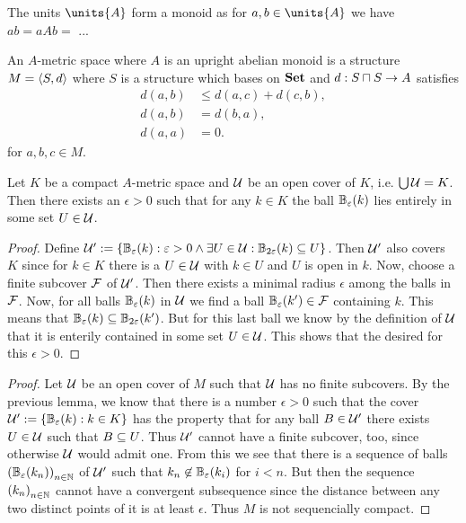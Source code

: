 \documentclass[8pt,a4paper]{article}
\begin{document}
\begin{remark}
    The units $\units{A}$ form a monoid as for $a,b\in\units{A}$ we have $ab=aAb=$ ...
\end{remark}

\begin{definition}
    An $A$-metric space where $A$ is an upright abelian monoid is a structure $M=\struct{S,d}$ where $S$ is a structure which bases on $\mathbf{Set}$ and $d:S\settimes S\to A$ satisfies
    \begin{align}
        d(a,b) &\leq d(a,c)+d(c,b),\\
        d(a,b) &=d(b,a),\\
        d(a,a) &=0.
    \end{align}
    for $a,b,c\in M$.
\end{definition}

\begin{lemma}[Lebesgue]
    Let $K$ be a compact $A$-metric space and $\mathcal{U}$ be an open cover of $K$, i.e. $\bigcup\mathcal{U}=K$. Then there exists an $\epsilon>0$ such that for any $k\in K$ the ball $\mathbb{B}_{\varepsilon}(k)$ lies entirely in some set $U\in \mathcal{U}$.
\end{lemma}

\begin{proof}
    Define $\cU':=\set{\ball_{\epsilon}(k):\epsilon>0\lgand\exists U\in\cU:\ball_{2\epsilon}(k)\setleq U}$. Then $\mathcal{U}'$ also covers $K$ since for $k\in K$ there is a $U\in\mathcal{U}$ with $k\in U$ and $U$ is open in $k$. Now, choose a finite subcover $\mathcal{F}$ of $\mathcal{U}'$. Then there exists a minimal radius $\epsilon$ among the balls in $\mathcal{F}$. Now, for all balls $\mathbb{B}_{\varepsilon}(k)$ in $\mathcal{U}$ we find a ball $\mathbb{B}_{\varepsilon}(k')\in\mathcal{F}$ containing $k$. This means that $\mathbb{B}_{\varepsilon}(k)\subseteq\mathbb{B}_{2\varepsilon}(k')$. But for this last ball we know by the definition of $\mathcal{U}$ that it is enterily contained in some set $U\in\mathcal{U}$.
    This shows that the desired for this $\epsilon>0$.
\end{proof}

\begin{lemma}

\end{lemma}

\begin{proof}
    Let $\mathcal{U}$ be an open cover of $M$ such that $\mathcal{U}$ has no finite subcovers. By the previous lemma, we know that there is a number $\epsilon>0$ such that the cover $\cU':=\set{\ball_{\epsilon}(k):k\in K}$ has the property that for any ball $B\in \mathcal{U}'$ there exists $U\in\mathcal{U}$ such that $B\subseteq U$. Thus $\mathcal{U}'$ cannot have a finite subcover, too, since otherwise $\mathcal{U}$ would admit one. From this we see that there is a sequence of balls $\net[n\in\nats]{\ball_{\epsilon}(k_n)}$ of $\mathcal{U}'$ such that $k_n\not\in \mathbb{B}_{\varepsilon}(k_i)$ for $i< n$. But then the sequence $\net[n\in\nats]{k_n}$ cannot have a convergent subsequence since the distance between any two distinct points of it is at least $\epsilon$. Thus $M$ is not sequencially compact.
\end{proof}
\end{document}
